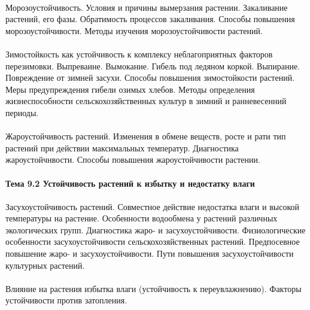 \paragraph*{}Морозоустойчивость. Условия и причины вымерзания растении. Закаливание растений, его фазы. Обратимость процессов закаливания. Способы повышения морозоустойчивости. Методы изучения морозоустойчивости растений.

\paragraph*{}Зимостойкость как устойчивость к комплексу неблагоприятных факторов перезимовки. Выпреваине. Вымокание. Гибель под ледяном коркой. Выпирание. Повреждение от зимней засухи. Способы повышения зимостойкости растений. Меры предупреждения гибели озимых хлебов. Методы определения жизнеспособности сельскохозяйственных культур в зимний и ранневесенний периоды.

\paragraph*{}Жароустойчивость растений. Изменения в обмене веществ, росте и рати тип растений при действии максимальных температур. Диагностика жароустойчнвости. Способы повышения жароустойчивости растении.

\paragraph*{Тема 9.2 Устойчивость растений к избытку и недостатку влаги}

\paragraph*{}Засухоустойчивость растений. Совместное действие недостатка влаги и высокой температуры на растение. Особенности водообмена у растений различных экологических групп. Диагностика жаро- и засухоустойчивости. Физиологические особенности засухоустойчивости сельскохозяйственных растений. Предпосевное повышение жаро-  и засухоустойчивости. Пути повышения засухоустойчивости культурных растений.

\paragraph*{}Влияние на растения избытка влаги (устойчивость к переувлажнению). Факторы устойчивости против затопления.

